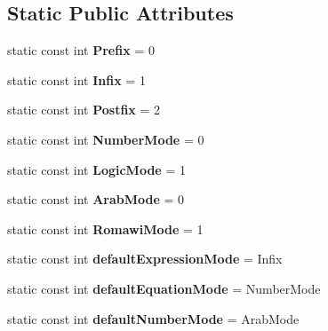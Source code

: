 \subsection*{Static Public Attributes}
\begin{DoxyCompactItemize}
\item 
\hypertarget{class_extension_a56fbee85e2edb251125b83250c27213c}{}static const int {\bfseries Prefix} = 0\label{class_extension_a56fbee85e2edb251125b83250c27213c}

\item 
\hypertarget{class_extension_a47d3403a109250b3bc0174fdb1de1f71}{}static const int {\bfseries Infix} = 1\label{class_extension_a47d3403a109250b3bc0174fdb1de1f71}

\item 
\hypertarget{class_extension_ad25868fca953adfbd2a22317feaf9b1f}{}static const int {\bfseries Postfix} = 2\label{class_extension_ad25868fca953adfbd2a22317feaf9b1f}

\item 
\hypertarget{class_extension_af88b9749ecfc6e2b25b2a43abc3a5be4}{}static const int {\bfseries Number\+Mode} = 0\label{class_extension_af88b9749ecfc6e2b25b2a43abc3a5be4}

\item 
\hypertarget{class_extension_afa6c3f7ccfba73f7a608424059ee919e}{}static const int {\bfseries Logic\+Mode} = 1\label{class_extension_afa6c3f7ccfba73f7a608424059ee919e}

\item 
\hypertarget{class_extension_aabc020a4a2fe164e7eaebf841ebab7bf}{}static const int {\bfseries Arab\+Mode} = 0\label{class_extension_aabc020a4a2fe164e7eaebf841ebab7bf}

\item 
\hypertarget{class_extension_ac9b5fd4a4e6be30d8d5ffe40342a7d22}{}static const int {\bfseries Romawi\+Mode} = 1\label{class_extension_ac9b5fd4a4e6be30d8d5ffe40342a7d22}

\item 
\hypertarget{class_extension_a60cc91398e9647450ee1211840b816cf}{}static const int {\bfseries default\+Expression\+Mode} = Infix\label{class_extension_a60cc91398e9647450ee1211840b816cf}

\item 
\hypertarget{class_extension_a5ab0b5b49a4ee3276b0b65acaefaf7ac}{}static const int {\bfseries default\+Equation\+Mode} = Number\+Mode\label{class_extension_a5ab0b5b49a4ee3276b0b65acaefaf7ac}

\item 
\hypertarget{class_extension_ac3e873d85dbb68e5524e7f54181f1298}{}static const int {\bfseries default\+Number\+Mode} = Arab\+Mode\label{class_extension_ac3e873d85dbb68e5524e7f54181f1298}

\end{DoxyCompactItemize}


